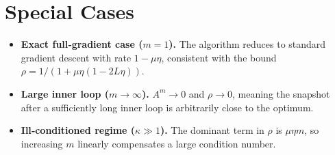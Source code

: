 \documentclass{article}
\begin{document}
\section*{Special Cases}
\begin{itemize}
\item \textbf{Exact full‑gradient case ($m=1$).} The algorithm reduces to standard gradient descent with rate $1-\mu\eta$, consistent with the bound $\rho=1/(1+\mu\eta(1-2L\eta))$.
\item \textbf{Large inner loop ($m\to\infty$).} $A^{m}\to0$ and $\rho\to 0$, meaning the snapshot after a sufficiently long inner loop is arbitrarily close to the optimum.
\item \textbf{Ill‑conditioned regime ($\kappa\gg1$).} The dominant term in $\rho$ is $\mu\eta m$, so increasing $m$ linearly compensates a large condition number.
\end{itemize}
\end{document}
